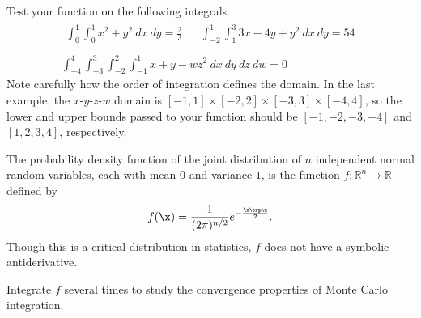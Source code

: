 Test your function on the following integrals.
\[
\begin{array}{c}
    \begin{array}{ccc}
    \displaystyle\int_0^1\int_0^1 x^2 + y^2\:dx\:dy = \frac{2}{3}
    & &
    \displaystyle\int_{-2}^1\int_1^3 3x - 4y + y^2\:dx\:dy = 54
    \end{array}
\\ \\
\displaystyle\int_{-4}^4\int_{-3}^3\int_{-2}^2\int_{-1}^1 x + y - w z^2\:dx\:dy\:dz\:dw = 0
\end{array}
\]
Note carefully how the order of integration defines the domain.
In the last example, the $x$-$y$-$z$-$w$ domain is $[-1,1]\times[-2,2]\times[-3,3]\times[-4,4]$, so the lower and upper bounds passed to your function should be $[-1, -2, -3, -4]$ and $[1, 2, 3, 4]$, respectively.
\label{prob:montecarlo-integration-nd}

The probability density function of the joint distribution of $n$ independent normal random variables, each with mean $0$ and variance $1$, is the function $f:\mathbb{R}^n\rightarrow\mathbb{R}$ defined by
\[
f(\x) = \frac{1}{(2 \pi)^{n/2}} e^{- \frac{\x\trp\x}{2}}.
\]
Though this is a critical distribution in statistics, $f$ does not have a symbolic antiderivative.

Integrate $f$ several times to study the convergence properties of Monte Carlo integration.


